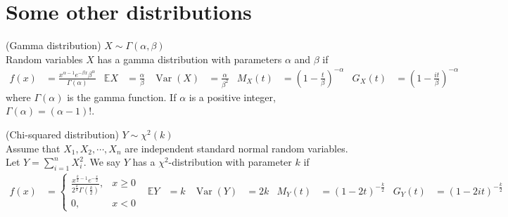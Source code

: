 \documentclass{huhtakm-template-book}
\newcommand{\expect}{\mathbb{E}}
\DeclareMathOperator{\Var}{Var}
\begin{document}
\chapter{Some other distributions}
\begin{eg}(Gamma distribution) $X\sim\Gamma(\alpha,\beta)$\\
    Random variables $X$ has a gamma distribution with parameters $\alpha$ and $\beta$ if
    \begin{align*}
        f(x)&=\frac{x^{\alpha-1}e^{-\beta x}\beta^{\alpha}}{\Gamma(\alpha)} & \expect X&=\frac{\alpha}{\beta} & \Var(X)&=\frac{\alpha}{\beta^{2}} & M_{X}(t)&=\left(1-\frac{t}{\beta}\right)^{-\alpha} & G_{X}(t)&=\left(1-\frac{it}{\beta}\right)^{-\alpha}
    \end{align*}
    where $\Gamma(\alpha)$ is the gamma function. If $\alpha$ is a positive integer, $\Gamma(\alpha)=(\alpha-1)!$.
\end{eg}
\begin{eg}(Chi-squared distribution) $Y\sim\chi^{2}(k)$\\
    Assume that $X_{1},X_{2},\cdots,X_{n}$ are independent standard normal random variables. Let $Y=\sum_{i=1}^{n}X_{i}^{2}$. We say $Y$ has a $\chi^{2}$-distribution with parameter $k$ if
    \begin{align*}
        f(x)&=\begin{cases}
            \frac{x^{\frac{k}{2}-1}e^{-\frac{x}{2}}}{2^{\frac{k}{2}}\Gamma\left(\frac{k}{2}\right)}, &x\geq 0\\
            0, &x<0
        \end{cases} & \expect Y&=k & \Var(Y)&=2k & M_{Y}(t)&=(1-2t)^{-\frac{k}{2}} & G_{Y}(t)&=(1-2it)^{-\frac{k}{2}}
    \end{align*}
\end{eg}
\end{document}
